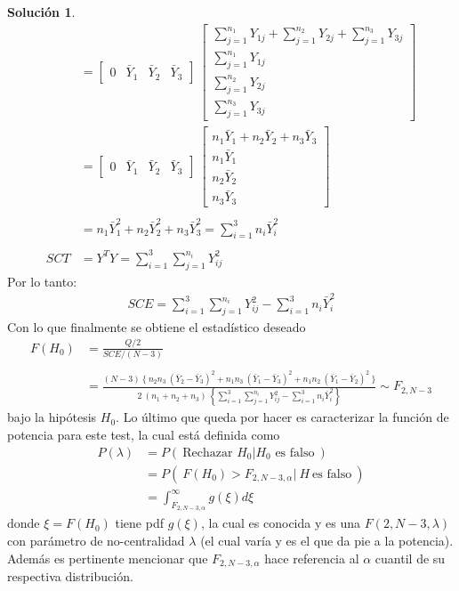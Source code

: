 \documentclass[12pt]{article}
\theoremstyle{plain}
\theoremstyle{definition}
\theoremstyle{definition}
\theoremstyle{definition}
\newtheorem*{solution}{Solución}
\begin{document}
\begin{solution}
\begin{align*}
&= \begin{bmatrix}
0 & \bar{Y}_1 & \bar{Y}_2 & \bar{Y}_3
\end{bmatrix}\ \begin{bmatrix}
\sum^{n_1}_{j=1}Y_{1j} + \sum^{n_2}_{j=1}Y_{2j} + \sum^{n_3}_{j=1}Y_{3j} \\
\sum^{n_1}_{j=1}Y_{1j} \\
\sum^{n_2}_{j=1}Y_{2j} \\
\sum^{n_3}_{j=1}Y_{3j}
\end{bmatrix}\\
&= \begin{bmatrix}
0 & \bar{Y}_1 & \bar{Y}_2 & \bar{Y}_3
\end{bmatrix}\ \begin{bmatrix}
n_1\bar{Y}_1+ n_2\bar{Y}_2 + n_3\bar{Y}_3 \\
n_1\bar{Y}_1 \\
n_2\bar{Y}_2 \\
n_3\bar{Y}_3
\end{bmatrix} \\ \\ 
&= n_1\bar{Y}_1^2+ n_2\bar{Y}_2^2 + n_3\bar{Y}_3^2 = \sum_{i=1}^{3} n_i \bar{Y}_i^2 \\  \\
SCT &= Y^TY = \sum_{i=1}^{3} \sum_{j=1}^{n_i} Y_{ij}^2
\end{align*}
Por lo tanto:
\begin{align*}
SCE=  \sum_{i=1}^{3} \sum_{j=1}^{n_i} Y_{ij}^2 - \sum_{i=1}^{3} n_i \bar{Y}_i^2  
\end{align*}
Con lo que finalmente se obtiene el estadístico deseado
\begin{align*}
F(H_0) &= \frac{Q/2}{SCE/(N-3)}\\ \\
&=  \frac{(N-3) \ \Bigg\{\: n_2n_3\ (\bar{Y}_2-\bar{Y}_3)^2 + n_1n_3\
(\bar{Y}_1-\bar{Y}_3)^2 + n_1n_2\ (\bar{Y}_1-\bar{Y}_2)^2 \:\Bigg\} }{2 \ (n_1+n_2+n_3) \ \left\{ \sum_{i=1}^{3} \sum_{j=1}^{n_i} Y_{ij}^2 - \sum_{i=1}^{3} n_i \bar{Y}_i^2 \right\} }  \sim F_{2,N-3}
\end{align*}
bajo la hipótesis $H_0$. Lo último que queda por hacer es caracterizar la función de potencia para este test, la cual está definida como 
\begin{align*}
    P(\lambda) &= P(\ \text{Rechazar $H_0|H_0$ es falso} \ ) \\
    &= P(\ F(H_0) > F_{2,N-3,\alpha} | \ H \:\text{es falso} \ ) \\
    &= \int_{F_{2,N-3,\alpha}}^{\infty} g(\xi) d\xi
\end{align*}
donde $\xi = F(H_0)$ tiene pdf $g(\xi)$, la cual es conocida y es una $F(2,N-3,\lambda)$ con parámetro de no-centralidad $\lambda$ (el cual varía y es el que da pie a la potencia). Además es pertinente mencionar que $F_{2,N-3,\alpha}$ hace referencia al $\alpha$ cuantil de su respectiva distribución.
\end{solution}
\end{document}
